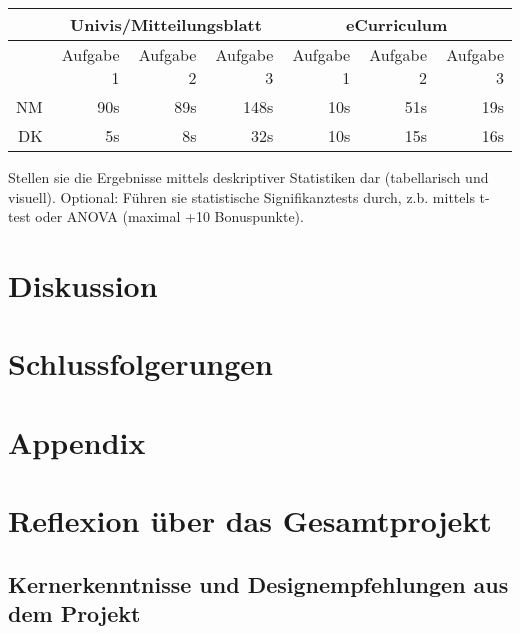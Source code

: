 \documentclass[a4paper,10pt]{scrartcl}
\begin{document}
\begin{center}
\begin{tabular}{r|r|r|r|r|r|r}
    & \multicolumn{3}{c|}{Univis/Mitteilungsblatt} & \multicolumn{3}{c}{eCurriculum} \\ \hline
    & Aufgabe 1 & Aufgabe 2 & Aufgabe 3 & Aufgabe 1 & Aufgabe 2 & Aufgabe 3  \\ \hline
    NM & 90s & 89s & 148s & 10s & 51s & 19s\\ \hline
    DK & 5s & 8s & 32s & 10s & 15s & 16s\\
\end{tabular}
\end{center}

Stellen sie die Ergebnisse mittels deskriptiver Statistiken dar (tabellarisch und visuell). 
Optional: Führen sie statistische Signifikanztests durch, z.b. mittels t-test oder ANOVA (maximal +10 Bonuspunkte). 

\section{Diskussion}


\section{Schlussfolgerungen}


\section{Appendix}

\section{Reflexion über das Gesamtprojekt}

\subsection{Kernerkenntnisse und Designempfehlungen aus dem Projekt}

% 
\end{document}
